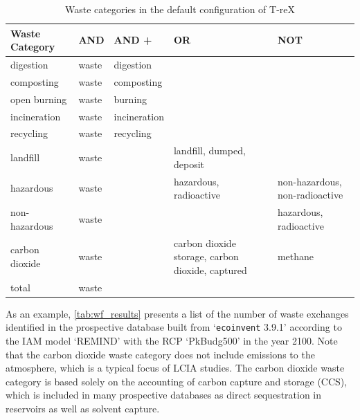 \documentclass{article}
\renewcommand{\texttt}[1]{{\ttfamily\small\nolinkurl{#1}}}
\begin{document}
\begin{table}[ht]
    \centering
    \caption{Waste categories in the default configuration of T-reX}\label{tab:waste_categories}
    \begin{tabularx}{\textwidth}{p{2.5cm}p{1cm}p{1.5cm}XX}
        \toprule
        \textbf{Waste Category} & \textbf{AND} & \textbf{AND +} & \textbf{OR}                                      & \textbf{NOT}                   \\
        \midrule
        digestion               & waste        & digestion      &                                                  &                                \\
        composting              & waste        & composting     &                                                  &                                \\
        open burning            & waste        & burning        &                                                  &                                \\
        incineration            & waste        & incineration   &                                                  &                                \\
        recycling               & waste        & recycling      &                                                  &                                \\
        landfill                & waste        &                & landfill, dumped, deposit                        &                                \\
        hazardous               & waste        &                & hazardous, radioactive                           & non-hazardous, non-radioactive \\
        non-hazardous           & waste        &                &                                                  & hazardous, radioactive         \\
        carbon dioxide          & waste        &                & carbon dioxide storage, carbon dioxide, captured & methane                        \\
        total                   & waste        &                &                                                  &                                \\
        \bottomrule
    \end{tabularx}
\end{table}


As an example, \autoref{tab:wf_results} presents a list of the number of waste exchanges identified in the prospective database built from `\texttt{ecoinvent} 3.9.1' according to the IAM model `REMIND' with the RCP `PkBudg500' in the year 2100. Note that the carbon dioxide waste category does not include emissions to the atmosphere, which is a typical focus of LCIA studies. The carbon dioxide waste category is based solely on the accounting of carbon capture and storage (CCS), which is included in many prospective databases as direct sequestration in reservoirs as well as solvent capture.
\end{document}
